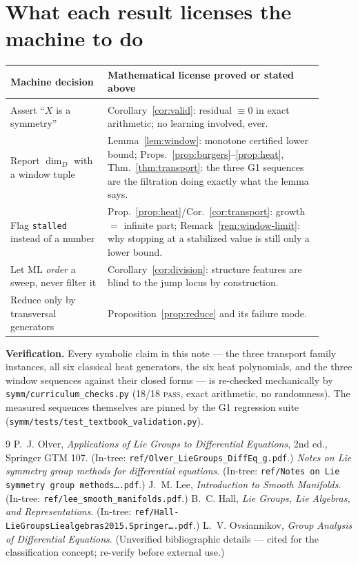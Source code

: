 \documentclass[11pt]{article}
\theoremstyle{plain}
\theoremstyle{definition}
\theoremstyle{remark}
\begin{document}
\section{What each result licenses the machine to do}\label{sec:license}

\begin{center}
\begin{tabular}{p{0.28\linewidth} p{0.62\linewidth}}
\textbf{Machine decision} & \textbf{Mathematical license proved or stated above}\\[2pt]
\hline\\[-8pt]
Assert ``$X$ is a symmetry'' & Corollary~\ref{cor:valid}: residual $\equiv0$ in exact arithmetic; no
learning involved, ever.\\[3pt]
Report $\dim_D$ with a window tuple & Lemma~\ref{lem:window}: monotone certified lower bound;
Props.~\ref{prop:burgers}--\ref{prop:heat}, Thm.~\ref{thm:transport}: the three G1 sequences are the
filtration doing exactly what the lemma says.\\[3pt]
Flag \texttt{stalled} instead of a number & Prop.~\ref{prop:heat}/Cor.~\ref{cor:transport}: growth
$=$ infinite part; Remark~\ref{rem:window-limit}: why stopping at a stabilized value is still only a
lower bound.\\[3pt]
Let ML \emph{order} a sweep, never filter it & Corollary~\ref{cor:division}: structure features are
blind to the jump locus by construction.\\[3pt]
Reduce only by transversal generators & Proposition~\ref{prop:reduce} and its failure mode.\\[3pt]
\hline
\end{tabular}
\end{center}

\medskip
\noindent\textbf{Verification.} Every symbolic claim in this note --- the three transport family
instances, all six classical heat generators, the six heat polynomials, and the three window
sequences against their closed forms --- is re-checked mechanically by
\texttt{symm/curriculum\_checks.py} (18/18 \textsc{pass}, exact arithmetic, no randomness). The
measured sequences themselves are pinned by the G1 regression suite
(\texttt{symm/tests/test\_textbook\_validation.py}).

\begin{thebibliography}{9}\small
{} P.~J. Olver, \emph{Applications of Lie Groups to Differential Equations}, 2nd ed.,
Springer GTM 107. (In-tree: \texttt{ref/Olver\_LieGroups\_DiffEq\_g.pdf}.)
 \emph{Notes on Lie symmetry group methods for differential equations}. (In-tree:
\texttt{ref/Notes on Lie symmetry group methods\ldots.pdf}.)
 J.~M. Lee, \emph{Introduction to Smooth Manifolds}. (In-tree:
\texttt{ref/lee\_smooth\_manifolds.pdf}.)
 B.~C. Hall, \emph{Lie Groups, Lie Algebras, and Representations}. (In-tree:
\texttt{ref/Hall-LieGroupsLiealgebras2015.Springer\ldots.pdf}.)
 L.~V. Ovsiannikov, \emph{Group Analysis of Differential Equations}. (Unverified
bibliographic details --- cited for the classification concept; re-verify before external use.)
\end{thebibliography}
\end{document}
